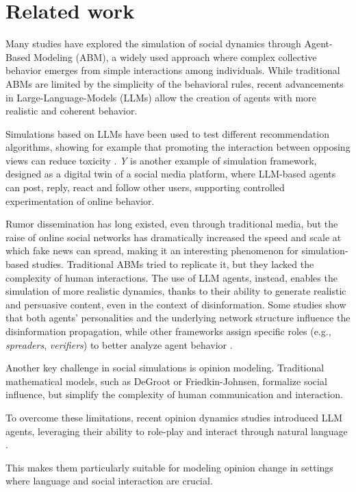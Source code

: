 \section{Related work}
\label{sec:relatedwork}


Many studies have explored the simulation of social dynamics through Agent-Based Modeling (ABM), a widely used approach where complex collective behavior emerges from simple interactions among individuals.
While traditional ABMs are limited by the simplicity of the behavioral rules, recent advancements in Large-Language-Models (LLMs) allow the creation of agents with more realistic and coherent behavior.

Simulations based on LLMs have been used to test different recommendation algorithms, showing for example that promoting the interaction between opposing views can reduce toxicity \cite{törnberg2023evaluate}.
\textit{Y} \cite{rossetti2024ysocialllmpoweredsocial} is another example of simulation framework, designed as a digital twin of a social media platform, where LLM-based agents can post, reply, react and follow other users, supporting controlled experimentation of online behavior.

\medskip
Rumor dissemination has long existed, even through traditional media, but the raise of online social networks has dramatically increased the speed and scale at which fake news can spread, making it an interesting phenomenon for simulation-based studies.
Traditional ABMs tried to replicate it, but they lacked the complexity of human interactions.
The use of LLM agents, instead, enables the simulation of more realistic dynamics, thanks to their ability to generate realistic and persuasive content, even in the context of disinformation.
Some studies show that both agents' personalities and the underlying network structure influence the disinformation propagation, while other frameworks assign specific roles (e.g., \textit{spreaders}, \textit{verifiers}) to better analyze agent behavior \cite{liu2024tinyslipgiantleap}.

\medskip
Another key challenge in social simulations is opinion modeling.
Traditional mathematical models, such as DeGroot or Friedkin-Johnsen, formalize social influence, but simplify the complexity of human communication and interaction.

To overcome these limitations, recent opinion dynamics studies introduced LLM agents, leveraging their ability to role-play and interact through natural language \cite{chuang2024simulatingopiniondynamicsnetworks}. 

This makes them particularly suitable for modeling opinion change in settings where language and social interaction are crucial.

